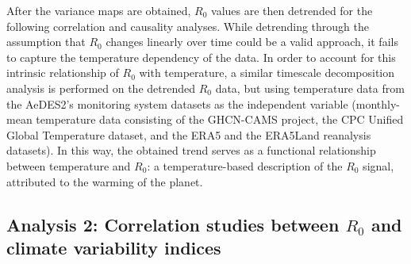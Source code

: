 \documentclass[10pt,twocolumn]{wlscirep}
\begin{document}
After the variance maps are obtained, $R_0$ values are then detrended for the following correlation and causality analyses. While detrending through the assumption that $R_0$ changes linearly over time could be a valid approach, it fails to capture the temperature dependency of the data. In order to account for this intrinsic relationship of $R_0$ with temperature, a similar timescale decomposition analysis is performed on the detrended $R_0$ data, but using temperature data from the AeDES2's monitoring system datasets as the independent variable (monthly-mean temperature data consisting of the GHCN-CAMS project\cite{fan_2008}, the CPC Unified Global Temperature dataset\cite{xie_2007}, and the ERA5 and the ERA5Land reanalysis datasets\cite{chen_2008}). In this way, the obtained trend serves as a functional relationship between temperature and $R_0$: a temperature-based description of the $R_0$ signal, attributed to the warming of the planet\cite{greene_2011}.

\subsection{Analysis 2: Correlation studies between $R_0$ and climate variability indices} \label{sec-methods-2}
\end{document}
